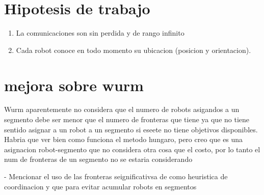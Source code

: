 \section{Hipotesis de trabajo}
\begin{enumerate}
  \item La comunicaciones son sin perdida y de rango infinito
  \item Cada robot conoce en todo momento su ubicacion (posicion y orientacion).
\end{enumerate}


\section{mejora sobre wurm}
Wurm aparentemente no considera que el numero de robots asigandos a un segmento debe ser menor que el numero de fronteras que tiene ya que no tiene sentido asignar a un robot  a un segmento si eseete no tiene objetivos disponibles. Habria que ver bien como funciona el metodo hungaro, pero creo que es una asignacion robot-segmento que no considera otra cosa que el costo, por lo tanto el num de fronteras de un segmento no se estaria considerando



- Mencionar el uso de las fronteras seignificativsa de \cite{amorin2019novel} como heuristica de coordinacion y que para evitar acumular robots en segmentos

